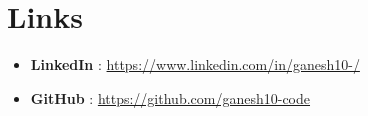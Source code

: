 \documentclass{article}
\begin{document}
\section*{Links}
\begin{itemize}[leftmargin=*]
    
        \item \textbf{ LinkedIn }: \href{ https://www.linkedin.com/in/ganesh10-/ }{ https://www.linkedin.com/in/ganesh10-/ }
    
        \item \textbf{ GitHub }: \href{ https://github.com/ganesh10-code }{ https://github.com/ganesh10-code }
    
\end{itemize}
\end{document}
